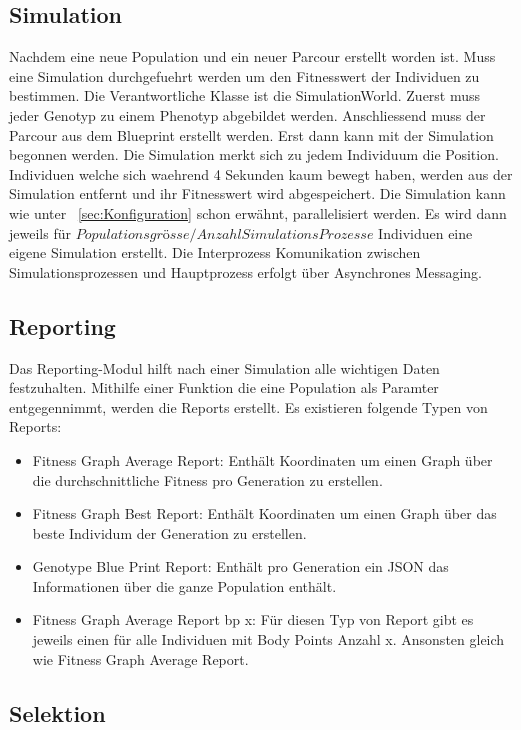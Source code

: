     \subsection{Simulation}
      Nachdem eine neue Population und ein neuer Parcour erstellt worden ist.
      Muss eine Simulation durchgefuehrt werden um den Fitnesswert der Individuen zu bestimmen.
      Die Verantwortliche Klasse ist die SimulationWorld. Zuerst muss jeder Genotyp zu einem Phenotyp abgebildet werden.
      Anschliessend muss der Parcour aus dem Blueprint erstellt werden. Erst dann kann mit der Simulation begonnen werden.
      Die Simulation merkt sich zu jedem Individuum die Position. Individuen welche sich waehrend 4 Sekunden kaum bewegt haben,
      werden aus der Simulation entfernt und ihr Fitnesswert wird abgespeichert.
      Die Simulation kann wie unter ~\ref{sec:Konfiguration} schon erwähnt, parallelisiert werden. Es wird dann jeweils für
      \( Populationsgrösse / Anzahl Simulations Prozesse \) Individuen eine eigene Simulation erstellt. Die Interprozess Komunikation
      zwischen Simulationsprozessen und Hauptprozess erfolgt über Asynchrones Messaging.

    \subsection{Reporting}
    \label{subsec:Reporting}
      Das Reporting-Modul hilft nach einer Simulation alle wichtigen Daten festzuhalten. Mithilfe einer Funktion die eine Population als Paramter entgegennimmt,
      werden die Reports erstellt. Es existieren folgende Typen von Reports:
      \begin{itemize}
        \item Fitness Graph Average Report: Enthält Koordinaten um einen Graph über die durchschnittliche Fitness pro Generation zu erstellen.
        \item Fitness Graph Best Report: Enthält Koordinaten um einen Graph über das beste Individum der Generation zu erstellen.
        \item Genotype Blue Print Report: Enthält pro Generation ein JSON das Informationen über die ganze Population enthält.
        \item Fitness Graph Average Report bp x: Für diesen Typ von Report gibt es jeweils einen für alle Individuen mit Body Points Anzahl x.
        Ansonsten gleich wie Fitness Graph Average Report.
      \end{itemize}


    \subsection{Selektion\label{sec:Selektion}}

